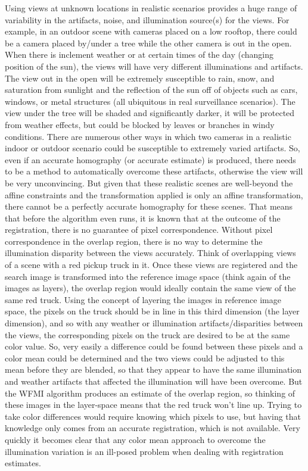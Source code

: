 Using views at unknown locations in realistic scenarios provides a huge range of variability in the artifacts, noise, and illumination source(s) for the views. For example, in an outdoor scene with cameras placed on a low rooftop, there could be a camera placed by/under a tree while the other camera is out in the open. When there is inclement weather or at certain times of the day (changing position of the sun), the views will have very different illuminations and artifacts. The view out in the open will be extremely susceptible to rain, snow, and saturation from sunlight and the reflection of the sun off of objects such as cars, windows, or metal structures (all ubiquitous in real surveillance scenarios). The view under the tree will be shaded and significantly darker, it will be protected from weather effects, but could be blocked by leaves or branches in windy conditions. There are numerous other ways in which two cameras in a realistic indoor or outdoor scenario could be susceptible to extremely varied artifacts. So, even if an accurate homography (or accurate estimate) is produced, there needs to be a method to automatically overcome these artifacts, otherwise the view will be very unconvincing. But given that these realistic scenes are well-beyond the affine constraints and the transformation applied is only an affine transformation, there cannot be a perfectly accurate homography for these scenes. That means that before the algorithm even runs, it is known that at the outcome of the registration, there is no guarantee of pixel correspondence. Without pixel correspondence in the overlap region, there is no way
to determine the illumination disparity between the views accurately. Think of overlapping views of a scene with a red pickup truck in it. Once these views are registered and the search image is transformed into the reference image space (think again of the images as layers), the overlap region would ideally contain the same view of the same red truck. Using the concept of layering the images in reference image space, the pixels on the truck should be in line in this third dimension (the layer dimension), and so with any weather or illumination artifacts/disparities between the views, the corresponding pixels on the truck are desired to be at the same color value. So, very easily a difference could be found between these pixels and a color mean could be determined and the two views could be adjusted to this mean before they are blended, so that they appear to have the same illumination and weather artifacts that affected the illumination will have been overcome. But the WFMI algorithm produces an estimate of the overlap region, so thinking of these images in the layer-space means that the red truck won't line up. Trying to take color differences would require knowing which pixels to use, but having that knowledge only comes from an accurate registration, which is not available. Very quickly it becomes clear that any color mean approach to overcome the illumination variation is an ill-posed problem when dealing with registration estimates.

